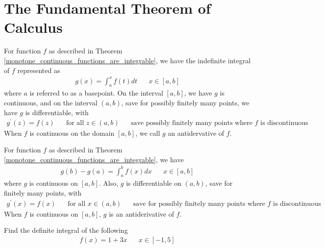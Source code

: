 \newpage
\section{The Fundamental Theorem of Calculus}

\begin{theorem}
For function $f$ as described in Theorem \ref{monotone_continuous_functions_are_integrable}, we have the indefinite integral of $f$ represented as
\begin{align*}
    g(x) = \int_{a}^{x} f(t) dt \hspace{20pt} x \in [a, b]
\end{align*}
where $a$ is referred to as a basepoint. On the interval $[a, b]$, we have $g$ is continuous, and on the interval $(a, b)$, save for possibly finitely many points, we have $g$ is differentiable, with
\begin{align*}
    g^{'}(z) = f(z) \hspace{20pt} \text{for all} \hspace{4pt} z \in (a, b) \hspace{20pt} \text{save possibly finitely many points where $f$ is discontinuous}
\end{align*}
When $f$ is continuous on the domain $[a, b]$, we call $g$ an antidervative of $f$. \label{FTC_1}
\end{theorem}

\begin{theorem}
For function $f$ as described in Theorem \ref{monotone_continuous_functions_are_integrable}, we have 
\begin{align*}
    g(b) - g(a) = \int_{a}^{b} f(x) dx \hspace{20pt} x \in [a, b]
\end{align*}
where $g$ is continuous on $[a, b]$. Also, $g$ is differentiable on $(a, b)$, save for finitely many points, with
\begin{align*}
    g^{'}(x) = f(x) \hspace{20pt} \text{for all} \hspace{4pt} x \in (a, b) \hspace{20pt} \text{save for possibly finitely many points where $f$ is discontinuous}
\end{align*}
When $f$ is continuous on $[a, b]$, $g$ is an antiderivative of $f$.
\end{theorem}

\begin{exercise}
Find the definite integral of the following
\begin{align*}
    f(x) = 1 + 3x \hspace{20pt} x \in [-1, 5]
\end{align*}
\end{exercise}

